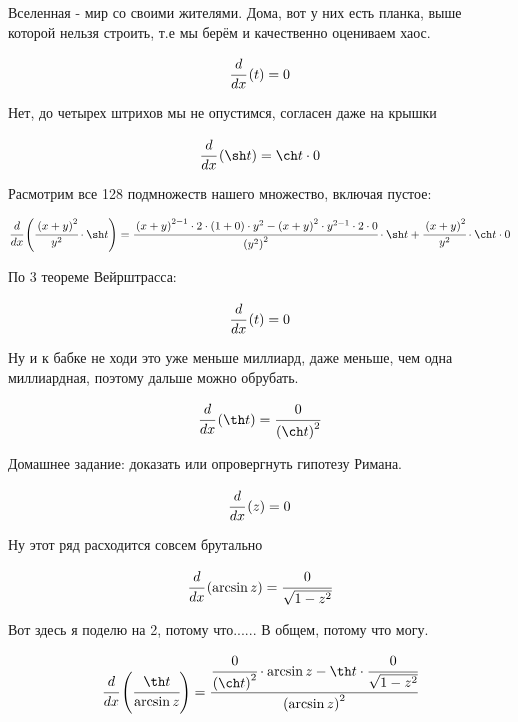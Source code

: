 Вселенная - мир со своими жителями. Дома, вот у них есть планка, выше которой нельзя строить, т.е мы берём и качественно оцениваем хаос. 


\begin{dmath}
 \cfrac{d}{d x} \left( t \right) = 0 
\end{dmath}


Нет, до четырех штрихов мы не опустимся, согласен даже на крышки


\begin{dmath}
 \cfrac{d}{d x} \left( \sh t \right) = \ch t \cdot 0 
\end{dmath}


Расмотрим все 128 подмножеств нашего множество, включая пустое:


\begin{dmath}
 \cfrac{d}{d x} \left( \cfrac{\left(x + y\right)^{2}}{y^{2}} \cdot \sh t \right) = \cfrac{\left(x + y\right)^{2 - 1} \cdot 2 \cdot \left(1 + 0\right) \cdot y^{2} - \left(x + y\right)^{2} \cdot y^{2 - 1} \cdot 2 \cdot 0}{\left(y^{2}\right)^{2}} \cdot \sh t + \cfrac{\left(x + y\right)^{2}}{y^{2}} \cdot \ch t \cdot 0 
\end{dmath}


По 3 теореме Вейрштрасса:


\begin{dmath}
 \cfrac{d}{d x} \left( t \right) = 0 
\end{dmath}


Ну и к бабке не ходи это уже меньше миллиард, даже меньше, чем одна миллиардная, поэтому дальше можно обрубать.


\begin{dmath}
 \cfrac{d}{d x} \left( \th t \right) = \cfrac{0}{\left(\ch t\right)^{2}} 
\end{dmath}


Домашнее задание: доказать или опровергнуть гипотезу Римана.


\begin{dmath}
 \cfrac{d}{d x} \left( z \right) = 0 
\end{dmath}


Ну этот ряд расходится совсем брутально


\begin{dmath}
 \cfrac{d}{d x} \left( \arcsin z \right) = \cfrac{0}{\sqrt{  1 - z^{2}}} 
\end{dmath}


Вот здесь я поделю на 2, потому что...... В общем, потому что могу.


\begin{dmath}
 \cfrac{d}{d x} \left( \cfrac{\th t}{\arcsin z} \right) = \cfrac{\cfrac{0}{\left(\ch t\right)^{2}} \cdot \arcsin z - \th t \cdot \cfrac{0}{\sqrt{  1 - z^{2}}}}{\left(\arcsin z\right)^{2}} 
\end{dmath}


